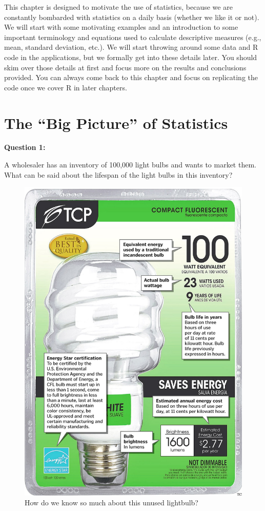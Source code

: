 \documentclass[
]{book}
\begin{document}
This chapter is designed to motivate the use of statistics, because we are constantly bombarded with statistics on a daily basis (whether we like it or not). We will start with some motivating examples and an introduction to some important terminology and equations used to calculate descriptive measures (e.g., mean, standard deviation, etc.). We will start throwing around some data and R code in the applications, but we formally get into these details later. You should skim over those details at first and focus more on the results and conclusions provided. You can always come back to this chapter and focus on replicating the code once we cover R in later chapters.

\hypertarget{the-big-picture-of-statistics}{%
\section{The ``Big Picture'' of Statistics}\label{the-big-picture-of-statistics}}

\textbf{Question 1:}

A wholesaler has an inventory of 100,000 light bulbs and wants to market them. What can be said about the lifespan of the light bulbs in this inventory?

\begin{figure}

{\centering \includegraphics[width=0.5\linewidth]{images/BULB} 

}

\caption{How do we know so much about this unused lightbulb?}\label{fig:unnamed-chunk-3}
\end{figure}
\end{document}
